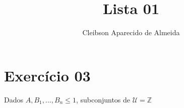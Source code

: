 \documentclass[]{article}
\title{Lista 01}
\author{Cleibson Aparecido de Almeida}
\begin{document}
\maketitle

\begin{abstract}

\end{abstract}

\section{Exercício 03}
Dados $A, B_1, ... , B_n \leq 1$, subconjuntos de $\mathcal{U} = \mathbb{Z}$
\end{document}
